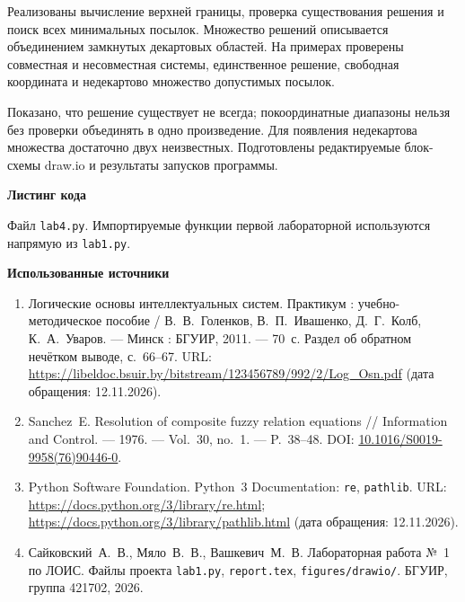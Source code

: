 \documentclass[14pt,a4paper]{extarticle}
\newcommand{\reportheading}[1]{\par\vspace{0.8\baselineskip}\noindent\textbf{#1}\par\nobreak\vspace{0.35\baselineskip}\nobreak}
\begin{document}
Реализованы вычисление верхней границы, проверка существования решения и поиск всех минимальных посылок. Множество решений описывается объединением замкнутых декартовых областей. На примерах проверены совместная и несовместная системы, единственное решение, свободная координата и недекартово множество допустимых посылок.

Показано, что решение существует не всегда; покоординатные диапазоны нельзя без проверки объединять в одно произведение. Для появления недекартова множества достаточно двух неизвестных. Подготовлены редактируемые блок-схемы draw.io и результаты запусков программы.

\clearpage
\reportheading{Листинг кода}
Файл \texttt{lab4.py}. Импортируемые функции первой лабораторной используются напрямую из \texttt{lab1.py}.


\clearpage
\reportheading{Использованные источники}
\begin{enumerate}[itemsep=0.5\baselineskip]
\RaggedRight
\item Логические основы интеллектуальных систем. Практикум : учебно-методическое пособие / В.~В.~Голенков, В.~П.~Ивашенко, Д.~Г.~Колб, К.~А.~Уваров. --- Минск : БГУИР, 2011. --- 70~с. Раздел об обратном нечётком выводе, с.~66--67. URL: \url{https://libeldoc.bsuir.by/bitstream/123456789/992/2/Log_Osn.pdf} (дата обращения: 12.11.2026).
\item Sanchez~E. Resolution of composite fuzzy relation equations // Information and Control. --- 1976. --- Vol.~30, no.~1. --- P.~38--48. DOI: \href{https://doi.org/10.1016/S0019-9958(76)90446-0}{10.1016/S0019-9958(76)90446-0}.
\item Python Software Foundation. Python~3 Documentation: \texttt{re}, \texttt{pathlib}. URL: \url{https://docs.python.org/3/library/re.html}; \url{https://docs.python.org/3/library/pathlib.html} (дата обращения: 12.11.2026).
\item Сайковский~А.~В., Мяло~В.~В., Вашкевич~М.~В. Лабораторная работа №~1 по ЛОИС. Файлы проекта \texttt{lab1.py}, \texttt{report.tex}, \texttt{figures/drawio/}. БГУИР, группа 421702, 2026.
\end{enumerate}
\end{document}
